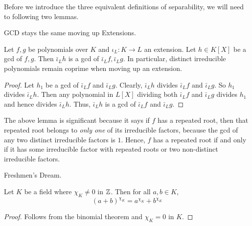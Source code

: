 \documentclass[../book.tex]{subfiles}
\begin{document}
Before we introduce the three equivalent definitions of separability, 
we will need to following two lemmas. 
\begin{lem} GCD stays the same moving up Extensions. 
    
    Let $f, g$ be polynomials over $K$ and $\iota_L : K \to L$ an extension.
    Let $h \in K[X]$ be a gcd of $f, g$. 
    Then $\bar\iota_L h$ is a gcd of $\bar\iota_L f, \bar\iota_L g$. 
    In particular, distinct irreducible polynomials remain coprime 
    when moving up an extension. 
\end{lem}
\begin{proof}
    Let $h_1$ be a gcd of $\bar\iota_L f$ and $\bar\iota_L g$. 
    Clearly, $\bar\iota_L h$ divides $\bar\iota_L f$ and $\bar\iota_L g$. 
    So $h_1$ divides $\bar\iota_L h$. 
    Then any polynomial in $L[X]$ dividing both $\bar\iota_L f$ and $\bar\iota_L g$
    divides $h_1$ and hence divides $\bar\iota_L h$. 
    Thus, $\bar\iota_L h$ is a gcd of $\bar\iota_L f$ and $\bar\iota_L g$. 
\end{proof}
\begin{rmk}
    The above lemma is significant because it says
    if $f$ has a repeated root, then that repeated root belongs to 
    \emph{only one} of its irreducible factors, 
    because the gcd of any two distinct irreducible factors is $1$. 
    Hence, $f$ has a repeated root if and only if it has some
    irreducible factor with repeated roots or two non-distinct irreducible factors.
\end{rmk}
\begin{lem} Freshmen's Dream.
    
    Let $K$ be a field where $\chi_K \neq 0$ in $\mathbb{Z}$. 
    Then for all $a, b \in K$, \[
        (a+b)^{\chi_K} = a^{\chi_K} + b^{\chi_K}
    \]
\end{lem}
\begin{proof}
    Follows from the binomial theorem and $\chi_K = 0$ in $K$. 
\end{proof}
\end{document}
